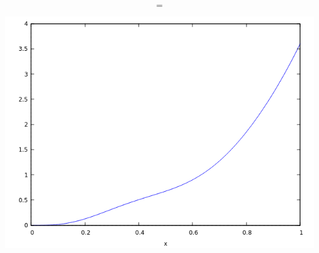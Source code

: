 \documentclass{beamer}
\begin{document}
\begin{frame}[fragile]
\begin{columns}
\end{columns}

$$=$$

\begin{center}\includegraphics[scale=0.2]{images/Beta_mixed_4_6_3_0_c_1_alpha.png}\end{center}

\end{frame}
\end{document}
